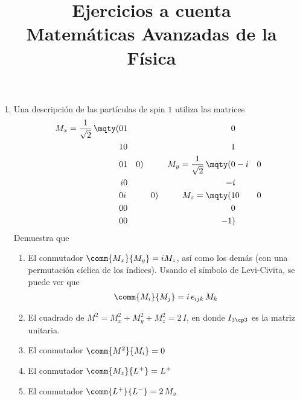 
\author{}
\title{Ejercicios a cuenta \\ {\large Matemáticas Avanzadas de la Física}\vspace{-1.5\baselineskip}}
\date{ }

\maketitle
\fontsize{14}{14}\selectfont
\begin{enumerate}
\item Una descripción de las partículas de spin $1$ utiliza las matrices
\begin{align*}
M_{x} = \dfrac{1}{\sqrt{2}} \, \mqty(0 & 1 & 0 \\ 1 & 0 & 1 \\ 0 & 1 & 0) \hspace{1cm} M_{y} = \dfrac{1}{\sqrt{2}} \, \mqty(0 & -i & 0 \\ i & 0 & -i \\ 0 & i & 0) \hspace{1cm} M_{z} = \mqty(1 & 0 & 0 \\ 0 & 0 & 0 \\ 0 & 0 & -1)
\end{align*}
Demuestra que
\begin{enumerate}
\item El conmutador $\comm{M_{x}}{M_{y}} = i M_{z}$, así como los demás (con una permutación cíclica de los índices). Usando el símbolo de Levi-Civita, se puede ver que
\begin{align*}
\comm{M_{i}}{M_{j}} = i \, \epsilon_{ijk} \, M_{k}
\end{align*}
\item El cuadrado de $M^{2}= M_{x}^{2} + M_{y}^{2} + M_{z}^{2} =  2 \, I$, en donde $I_{3 \cp 3}$ es la matriz unitaria.
\item El conmutador $\comm{M^{2}}{M_{i}} = 0$
\item El conmutador $\comm{M_{z}}{L^{+}} = L^{+}$
\item El conmutador $\comm{L^{+}}{L^{-}} = 2 \, M_{z}$


\end{enumerate}
\end{enumerate}
